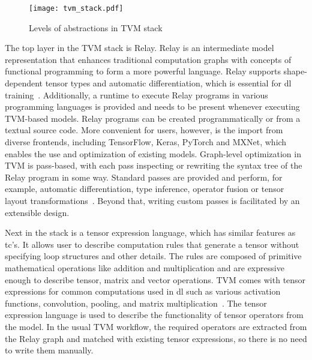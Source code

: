 \begin{figure}
	\centering
	\texttt{[image: tvm\_stack.pdf]}%
	\caption{Levels of abstractions in TVM stack}
	\label{fig:tvm-stack}
\end{figure}

The top layer in the TVM stack is Relay. Relay is an intermediate model representation that enhances traditional computation graphs with concepts of functional programming to form a more powerful language. Relay supports shape-dependent tensor types and automatic differentiation, which is essential for \gls{dl} training~\cite[p.~61]{Roesch.2018}.  Additionally, a runtime to execute Relay programs in various programming languages is provided and needs to be present whenever executing TVM-based models. Relay programs can be created programmatically or from a textual source code. More convenient for users, however, is the import from diverse frontends, including TensorFlow, Keras, PyTorch and MXNet, which enables the use and optimization of existing models. Graph-level optimization in TVM is pass-based, with each pass inspecting or rewriting the syntax tree of the Relay program in some way. Standard passes are provided and perform, for example, automatic differentiation, type inference, operator fusion or tensor layout transformations~\cite[p.~3]{Chen.2018b}. Beyond that, writing custom passes is facilitated by an extensible design.

Next in the stack is a tensor expression language, which has similar features as \gls{tc}'s. It allows user to describe computation rules that generate a tensor without specifying loop structures and other details. The rules are composed of primitive mathematical operations like addition and multiplication and are expressive enough to describe tensor, matrix and vector operations. TVM comes with tensor expressions for common computations used in \gls{dl} such as various activation functions, convolution, pooling, and matrix multiplication~\cite[p.~4~f.]{Chen.2018b}. The tensor expression language is used to describe the functionality of tensor operators from the model. In the usual TVM workflow, the required operators are extracted from the Relay graph and matched with existing tensor expressions, so there is no need to write them manually.

